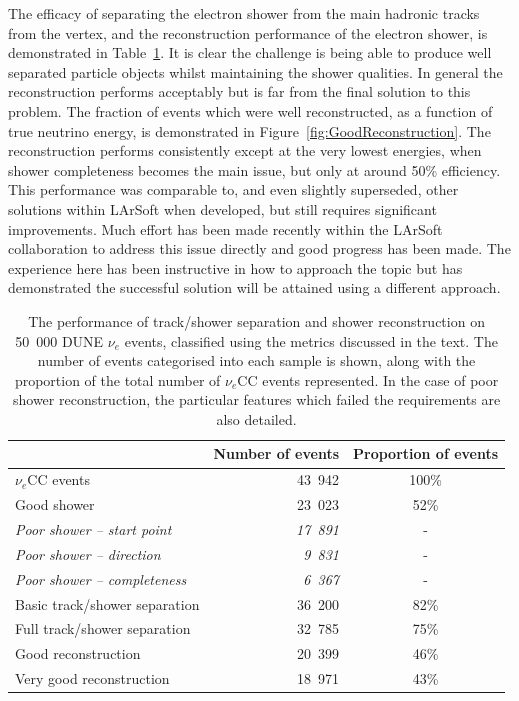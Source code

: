 The efficacy of separating the electron shower from the main hadronic tracks from the vertex, and the reconstruction performance of the electron shower, is demonstrated in Table~\ref{tab:GoodReconstruction}.  It is clear the challenge is being able to produce well separated particle objects whilst maintaining the shower qualities.  In general the reconstruction performs acceptably but is far from the final solution to this problem.  The fraction of events which were well reconstructed, as a function of true neutrino energy, is demonstrated in Figure~\ref{fig:GoodReconstruction}.  The reconstruction performs consistently except at the very lowest energies, when shower completeness becomes the main issue, but only at around 50\% efficiency.  This performance was comparable to, and even slightly superseded, other solutions within LArSoft when developed, but still requires significant improvements.  Much effort has been made recently within the LArSoft collaboration to address this issue directly and good progress has been made.  The experience here has been instructive in how to approach the topic but has demonstrated the successful solution will be attained using a different approach.

\begin{table}
  \centering
  \caption[The performance of track/shower separation and shower reconstruction on 50~000 DUNE $\nu_e$ events.]{The performance of track/shower separation and shower reconstruction on 50~000 DUNE $\nu_e$ events, classified using the metrics discussed in the text.  The number of events categorised into each sample is shown, along with the proportion of the total number of $\nu_e$CC events represented.  In the case of poor shower reconstruction, the particular features which failed the requirements are also detailed.}
  \label{tab:GoodReconstruction}
  \begin{tabular}{l r c}
    \toprule
      & Number of events & Proportion of events \\
    \midrule
    $\nu_e$CC events                     & 43~942 & 100\% \\
    Good shower                          & 23~023 & 52\%  \\
    \textit{Poor shower -- start point}  & \textit{17~891} & -     \\
    \textit{Poor shower -- direction}    & \textit{9~831}  & -     \\
    \textit{Poor shower -- completeness} & \textit{6~367}  & -     \\
    Basic track/shower separation        & 36~200 & 82\%  \\
    Full track/shower separation         & 32~785 & 75\%  \\
    Good reconstruction                  & 20~399 & 46\%  \\
    Very good reconstruction             & 18~971 & 43\%  \\
    \bottomrule
  \end{tabular}
\end{table}

